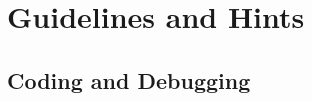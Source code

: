 \documentclass[paper=letter, fontsize=10pt]{scrartcl} %
\numberwithin{equation}{section} %
\numberwithin{figure}{section} %
\numberwithin{table}{section} %
\begin{document}

\section{Guidelines and Hints}

\subsection{Coding and Debugging}
\end{document}
